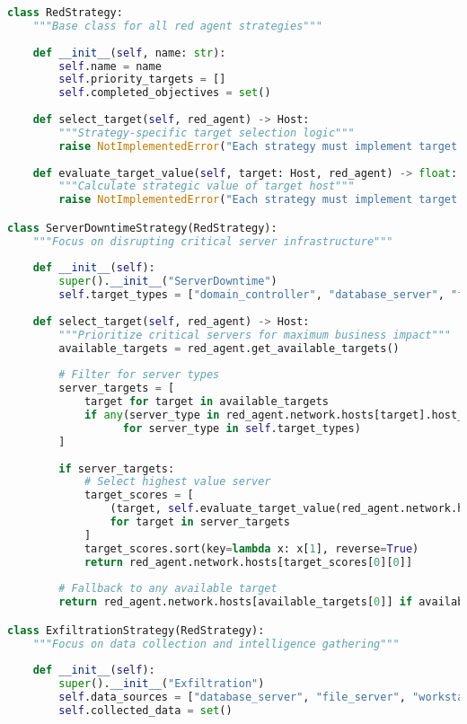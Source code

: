 \documentclass[12pt,a4paper]{article}
\begin{document}
\begin{lstlisting}[language=Python, caption=Red Agent Strategy Framework]
class RedStrategy:
    """Base class for all red agent strategies"""
    
    def __init__(self, name: str):
        self.name = name
        self.priority_targets = []
        self.completed_objectives = set()
        
    def select_target(self, red_agent) -> Host:
        """Strategy-specific target selection logic"""
        raise NotImplementedError("Each strategy must implement target selection")
        
    def evaluate_target_value(self, target: Host, red_agent) -> float:
        """Calculate strategic value of target host"""
        raise NotImplementedError("Each strategy must implement target evaluation")

class ServerDowntimeStrategy(RedStrategy):
    """Focus on disrupting critical server infrastructure"""
    
    def __init__(self):
        super().__init__("ServerDowntime")
        self.target_types = ["domain_controller", "database_server", "file_server"]
        
    def select_target(self, red_agent) -> Host:
        """Prioritize critical servers for maximum business impact"""
        available_targets = red_agent.get_available_targets()
        
        # Filter for server types
        server_targets = [
            target for target in available_targets 
            if any(server_type in red_agent.network.hosts[target].host_type.name.lower() 
                  for server_type in self.target_types)
        ]
        
        if server_targets:
            # Select highest value server
            target_scores = [
                (target, self.evaluate_target_value(red_agent.network.hosts[target], red_agent))
                for target in server_targets
            ]
            target_scores.sort(key=lambda x: x[1], reverse=True)
            return red_agent.network.hosts[target_scores[0][0]]
        
        # Fallback to any available target
        return red_agent.network.hosts[available_targets[0]] if available_targets else red_agent.current_host

class ExfiltrationStrategy(RedStrategy):
    """Focus on data collection and intelligence gathering"""
    
    def __init__(self):
        super().__init__("Exfiltration")
        self.data_sources = ["database_server", "file_server", "workstation"]
        self.collected_data = set()
        

\end{lstlisting}
\end{document}
